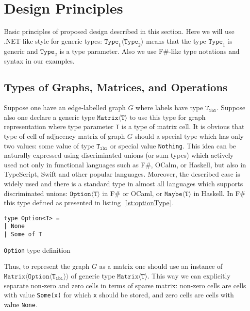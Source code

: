 \section{Design Principles}

Basic principles of proposed design described in this section.
Here we will use .NET-like style for generic types: $\texttt{Type}_1\langle\texttt{Type}_2\rangle$ means that the type $\texttt{Type}_1$ is generic and $\texttt{Type}_2$ is a type parameter.
Also we use F\#-like type notations and syntax in our examples.

\subsection{Types of Graphs, Matrices, and Operations}

Suppose one have an edge-labelled graph $G$ where labels have type $\texttt{T}_{\texttt{lbl}}$. 
Suppose also one declare a generic type $\texttt{Matrix} \langle \texttt{T} \rangle$ to use this type for graph representation where type parameter \texttt{T} is a type of matrix cell. 
It is obvious that type of cell of adjacency matrix of graph $G$ should a special type which has only two values: some value of type $\texttt{T}_{\texttt{lbl}}$ or special value \texttt{Nothing}.
This idea can be naturally expressed using discriminated unions (or sum types) which actively used not only in functional languages such as F\#, OCalm, or Haskell, but also in TypeScript, Swift and other popular languages. 
Moreover, the described case is widely used and there is a standard type in almost all languages which supports discriminated unions: $\texttt{Option} \langle \texttt{T} \rangle$ in F\# or OCaml, or $\texttt{Maybe} \langle \texttt{T} \rangle$ in Haskell. 
In F\# this type defined as presented in listing~\ref{lst:optionType}.

\begin{listing}[h]
\begin{verbatim}
type Option<T> =
| None
| Some of T
\end{verbatim}
\caption{\texttt{Option} type definition}
\label{lst:optionType}
\end{listing}


Thus, to represent the graph $G$ as a matrix one should use an instance of $\texttt{Matrix} \langle \texttt{Option}\langle \texttt{T}_{\texttt{lbl}} \rangle \rangle $  of generic type $\texttt{Matrix}\langle \texttt{T} \rangle$.
This way we can explicitly separate non-zero and zero cells in terms of sparse matrix: non-zero cells are cells with value \texttt{Some(x)} for which \texttt{x} should be stored, and zero cells are cells with value \texttt{None}.

